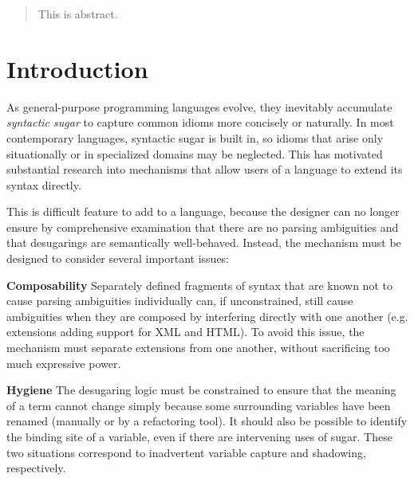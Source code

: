\documentclass{sig-alternate}
\begin{document}
\maketitle
\begin{abstract}
This is abstract.
\end{abstract}


\section{Introduction}
As general-purpose programming languages evolve, they inevitably accumulate \emph{syntactic sugar} to capture common idioms more concisely or naturally. In most contemporary languages, syntactic sugar is built in, so idioms that arise only situationally or in specialized domains may be neglected. This has motivated substantial research into mechanisms that allow users of a language to extend its syntax directly. 

This is difficult feature to add to a language, because the designer can no longer ensure by comprehensive examination that there are no parsing ambiguities and that desugarings are semantically well-behaved. Instead, the mechanism must be designed to consider several important issues:

\noindent
\textbf{Composability} Separately defined fragments of syntax that are known not to cause parsing ambiguities individually can, if unconstrained, still cause ambiguities when they are composed by interfering directly with one another (e.g. extensions adding support for XML and HTML). To avoid this issue, the mechanism must  separate extensions from one another, without sacrificing too much expressive power.

\noindent
\textbf{Hygiene} The desugaring logic  must be constrained to ensure that the meaning of a term cannot change simply because some surrounding variables have been renamed (manually or by a refactoring tool). It should also be possible to identify the binding site of a variable, even if there are intervening uses of sugar. These two situations correspond to inadvertent variable capture and shadowing, respectively. 
\end{document}
